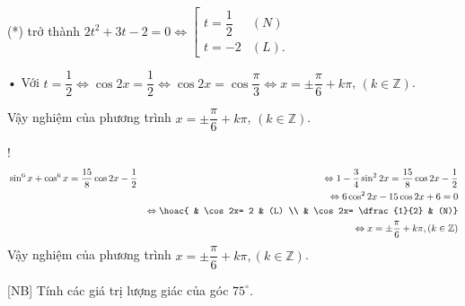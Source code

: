 \begin{bt}
{\begin{listEX}[2]
			(*) trở thành $ 2t^2 + 3t - 2 = 0 \Leftrightarrow 
			\left[\begin{array}{lr}
				t = \dfrac{1}{2}& (N)\\
				t =  - 2& (L).
			\end{array} \right.$
			
			• Với $t=\dfrac{1}{2}\Leftrightarrow 
			\cos 2x=\dfrac{1}{2}\Leftrightarrow 
			\cos 2x=\cos \dfrac{\pi}{3}\Leftrightarrow 
			x=\pm \dfrac{\pi}{6}+k\pi $, $( k\in \mathbb{Z})$.
			
			Vậy nghiệm của phương trình $x=\pm \dfrac{\pi}{6}+k\pi$, $( k\in \mathbb{Z})$.
			\item! 
			\begin{eqnarray*}
				&\sin^6x + \cos^6x = \dfrac{15}{8} \cos 2x - \dfrac{1}{2}
				&\Leftrightarrow 1-\dfrac{3}{4}\sin^22x= \dfrac{15}{8} \cos 2x - \dfrac{1}{2}\\
				&&\Leftrightarrow 6\cos^2 2x-15\cos 2x+6=0\\
				&&\Leftrightarrow 
				\hoac{ & \cos 2x= 2 & (L) \\ & \cos 2x= \dfrac{1}{2} & (N)}\\
				&&\Leftrightarrow x=\pm \dfrac{\pi}{6}+k\pi, (k\in \mathbb{Z})
			\end{eqnarray*}
			Vậy nghiệm của phương trình  
			$  x=\pm \dfrac{\pi}{6}+k\pi, (k\in \mathbb{Z})$. 
		\end{listEX}
	}
\end{bt}

\begin{bt}%
[NB]%
	Tính các giá trị lượng giác của góc $75^{\circ}$.
\end{bt}

